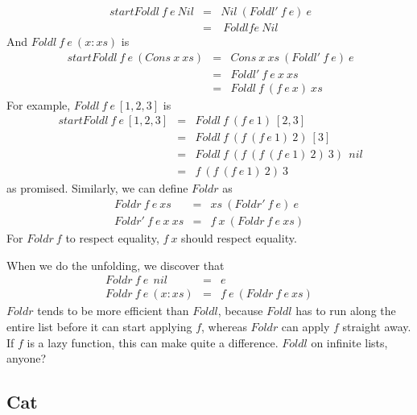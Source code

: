 \begin{eqnarray*}
   \ start{Foldl~f~e~Nil}  
   &  =  &  Nil~(Foldl'~f~e)~e  \\
   &  =  &  \ Foldl{f}{e}\ Nil
\end{eqnarray*}
And $Foldl~f~e~(x:xs)$ is
\begin{eqnarray*}
   \ start{Foldl~f~e~(Cons~x~xs)}  
   &  =  &  Cons~x~xs~(Foldl'~f~e)~e  \\
   &  =  &  Foldl'~f~e~x~xs  \\
   &  =  &  Foldl~f~(f~e~x)~xs
\end{eqnarray*}
For example, $Foldl~f~e~[1,2,3]$ is
\begin{eqnarray*}
   \ start{Foldl~f~e~[1,2,3]}  
   &  =  &  Foldl~f~(f~e~1)~[2,3]  \\
   &  =  &  Foldl~f~(f~(f~e~1)~2)~[3]  \\
   &  =  &  Foldl~f~(f~(f~(f~e~1)~2)~3)~\ nil  \\
   &  =  &  f~(f~(f~e~1)~2)~3
\end{eqnarray*}
as promised.  Similarly, we can define $Foldr$ as
\begin{eqnarray*}
      Foldr~f~e~xs  &  =  &  xs~(Foldr'~f~e)~e  \\
   Foldr'~f~e~x~xs  &  =  &  f~x~(Foldr~f~e~xs)
\end{eqnarray*}
For $Foldr~f$ to respect equality, $f~x$ should respect equality.

When we do the unfolding, we discover that
\begin{eqnarray*}
       Foldr~f~e~\ nil  &  =  &  e  \\
   Foldr~f~e~(x:xs)  &  =  &  f~e~(Foldr~f~e~xs)
\end{eqnarray*}
$Foldr$ tends to be more efficient than $Foldl$, because $Foldl$
has to run along the entire list before it can start applying $f$,
whereas $Foldr$ can apply $f$ straight away.  If $f$ is a lazy function,
this can make quite a difference.  $Foldl$ on infinite lists, anyone?


\subsection{Cat}

